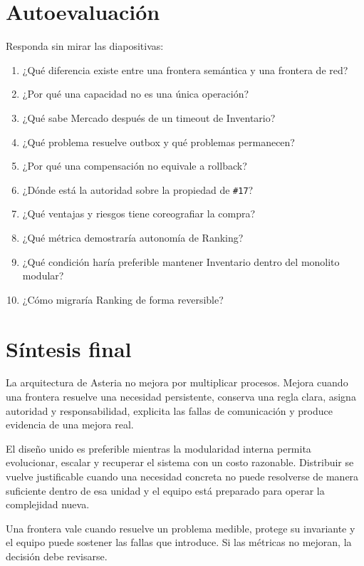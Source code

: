 \documentclass[variant=apuntes,cover=institutional,mode=screen]{ua-engineering-v6-article}
\begin{document}
\section{Autoevaluación}

Responda sin mirar las diapositivas:

\begin{enumerate}
\item ¿Qué diferencia existe entre una frontera semántica y una frontera de red?
\item ¿Por qué una capacidad no es una única operación?
\item ¿Qué sabe Mercado después de un timeout de Inventario?
\item ¿Qué problema resuelve outbox y qué problemas permanecen?
\item ¿Por qué una compensación no equivale a rollback?
\item ¿Dónde está la autoridad sobre la propiedad de \texttt{\#17}?
\item ¿Qué ventajas y riesgos tiene coreografiar la compra?
\item ¿Qué métrica demostraría autonomía de Ranking?
\item ¿Qué condición haría preferible mantener Inventario dentro del monolito modular?
\item ¿Cómo migraría Ranking de forma reversible?
\end{enumerate}

\section{Síntesis final}

La arquitectura de Asteria no mejora por multiplicar procesos. Mejora cuando una frontera resuelve una necesidad persistente, conserva una regla clara, asigna autoridad y responsabilidad, explicita las fallas de comunicación y produce evidencia de una mejora real.

El diseño unido es preferible mientras la modularidad interna permita evolucionar, escalar y recuperar el sistema con un costo razonable. Distribuir se vuelve justificable cuando una necesidad concreta no puede resolverse de manera suficiente dentro de esa unidad y el equipo está preparado para operar la complejidad nueva.

\begin{uakeybox}
Una frontera vale cuando resuelve un problema medible, protege su invariante y el equipo puede sostener las fallas que introduce. Si las métricas no mejoran, la decisión debe revisarse.
\end{uakeybox}
\end{document}
